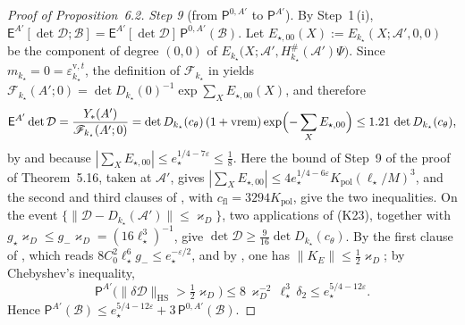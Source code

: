 \documentclass[11pt,letterpaper,reqno]{amsart}
\theoremstyle{definition}
\begin{document}
\begin{proof}[Proof of Proposition~6.2]
\emph{Step 9} (from $\mathsf P^{0,A'}$ to $\mathsf P^{A'}$).
By Step~1\,(i), $\mathsf E^{A'}[\det\mathcal D;\mathcal B]=\allowbreak \mathsf E^{A'}[\det\mathcal D]\,\allowbreak \mathsf P^{0,A'}(\mathcal B)$.
Let $E_{\star,00}(X):=E_{k_\star}(X;\mathscr A',0,0)$ be the component of degree $(0,0)$ of $E_{k_\star}\bigl(X;\mathscr A',\allowbreak H^\#_{k_\star}(\mathscr A')\Psi\bigr)$.
Since $m_{k_\star}=0=\varepsilon^{\mathrm v,t}_{k_\star}$, the definition of $\mathscr F_{k_\star}$ in \cite[Section~I.5.7]{QEDIII} yields $\mathscr F_{k_\star}(A';0)=\allowbreak \det D_{k_\star}(0)^{-1}\exp\sum_XE_{\star,00}(X)$, and therefore
\begin{equation*}
\mathsf E^{A'}\det\mathcal D=\frac{Y_*(A')}{\mathscr F_{k_\star}(A';0)}=\det D_{k_\star}(c_\theta)\,(1+\mathrm{vrem})\exp\Bigl(-\sum_XE_{\star,00}\Bigr)\le1.21\,\det D_{k_\star}(c_\theta),
\end{equation*}
by \cite[Proposition~30.3\,(f)]{QEDIII} and because $|\sum_XE_{\star,00}|\le e_\star^{1/4-7\varepsilon}\le\frac18$.
Here the bound of Step~9 of the proof of Theorem~5.16, taken at $\mathscr A'$, gives $|\sum_XE_{\star,00}|\le4e_\star^{1/4-6\varepsilon}K_{\mathrm{pol}}(\ell_\star/M)^3$, and the second and third clauses of \cite[(T2)]{QEDIII}, with $c_{\mathrm{fl}}=3294K_{\mathrm{pol}}$, give the two inequalities.
On the event $\{\|\mathcal D-D_{k_\star}(\mathscr A')\|\le\varkappa_D\}$, two applications of (K23), together with $g_\star\varkappa_D\le g_-\varkappa_D=(16\ell_\star^3)^{-1}$, give $\det\mathcal D\ge\frac9{16}\det D_{k_\star}(c_\theta)$.
By the first clause of \cite[(T2)]{QEDIII}, which reads $8C_0^2\ell_\star^6g_-\le e_\star^{-\varepsilon/2}$, and by \cite[(fl)]{QEDIII}, one has $\|K_E\|\le\frac12\varkappa_D$;
by Chebyshev's inequality,
\begin{equation*}
\mathsf P^{A'}\bigl(\|\delta\mathcal D\|_{\mathrm{HS}}>\tfrac12\varkappa_D\bigr)\le8\,\varkappa_D^{-2}\,\ell_\star^3\,\delta_2\le e_\star^{5/4-12\varepsilon}.
\end{equation*}
Hence $\mathsf P^{A'}(\mathcal B)\le e_\star^{5/4-12\varepsilon}+3\,\allowbreak \mathsf P^{0,A'}(\mathcal B)$.


\end{proof}
\end{document}
